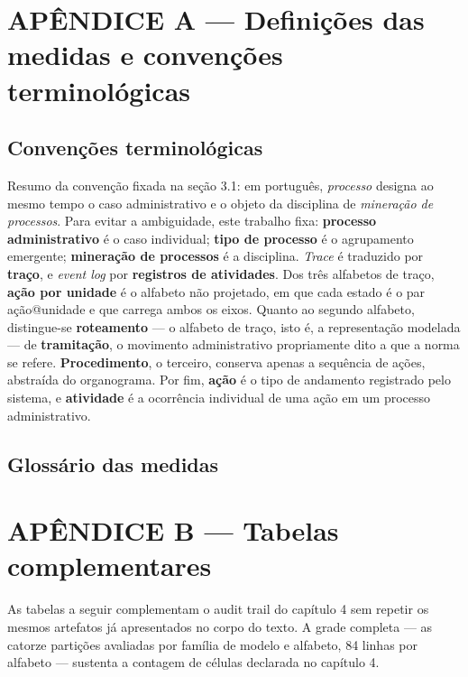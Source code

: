 \newpage
\section*{APÊNDICE A --- Definições das medidas e convenções terminológicas}

\subsection*{Convenções terminológicas}

Resumo da convenção fixada na seção 3.1: em português, \emph{processo} designa ao mesmo tempo o
caso administrativo e o objeto da disciplina de \emph{mineração de processos}. Para evitar a
ambiguidade, este trabalho fixa: \textbf{processo administrativo} é o caso individual;
\textbf{tipo de processo} é o agrupamento emergente; \textbf{mineração de processos} é a
disciplina. \emph{Trace} é traduzido por \textbf{traço}, e \emph{event log} por \textbf{registros
de atividades}. Dos três alfabetos de traço, \textbf{ação por unidade} é o alfabeto não projetado, em que
cada estado é o par ação@unidade e que carrega ambos os eixos. Quanto ao segundo alfabeto,
distingue-se \textbf{roteamento} --- o alfabeto de traço, isto é, a representação modelada --- de
\textbf{tramitação}, o movimento administrativo propriamente dito a que a norma se refere.
\textbf{Procedimento}, o terceiro, conserva apenas a sequência de ações, abstraída do organograma.
Por fim, \textbf{ação} é o tipo de andamento registrado pelo sistema, e \textbf{atividade} é a
ocorrência individual de uma ação em um processo administrativo.

\subsection*{Glossário das medidas}



\newpage
\section*{APÊNDICE B --- Tabelas complementares}

As tabelas a seguir complementam o audit trail do capítulo 4 sem repetir os mesmos artefatos já
apresentados no corpo do texto. A grade completa --- as catorze partições avaliadas por família de
modelo e alfabeto, 84 linhas por alfabeto --- sustenta a contagem de células declarada no capítulo 4.


